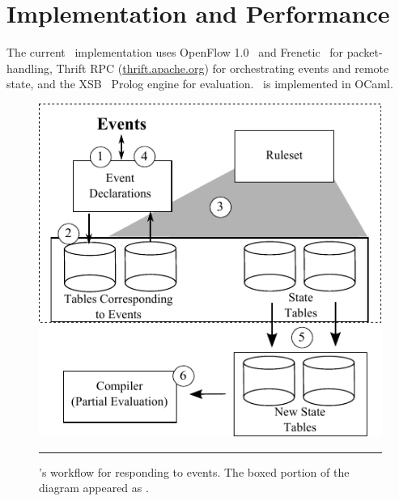 \section{Implementation and Performance}
\label{sec:impl}

The current \flowlog\ implementation uses OpenFlow
1.0~\cite{McKeown:ccr08-openflow} and 
Frenetic~\cite{foster:icfp11-frenetic} for packet-handling, 
Thrift RPC (\url{thrift.apache.org})
for orchestrating
events and remote state, and the XSB~\cite{sagonas++:sigmod94-xsb} Prolog
engine for evaluation. \flowlog\ is implemented in OCaml.


\begin{figure}
\includegraphics[scale=0.95]{figs/eval-cycle.pdf}
\caption{\small \flowlog's workflow for responding to events. The boxed portion of the diagram appeared as .}
\label{fig:workflow}
\hrule
\end{figure}

